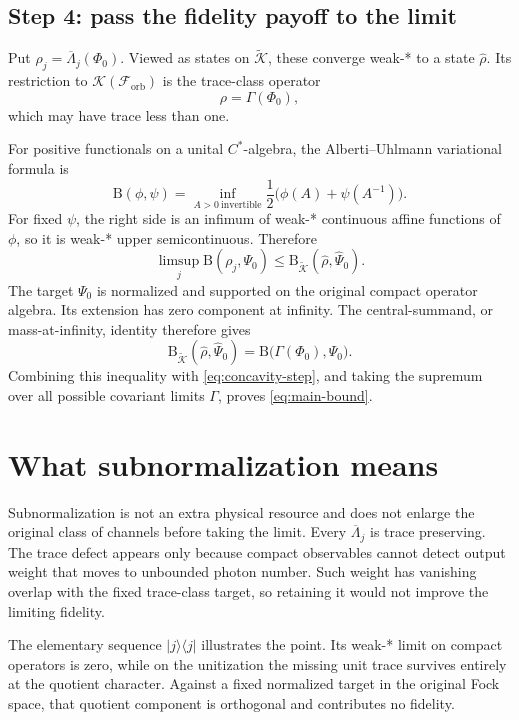 \documentclass[11pt]{article}
\newcommand{\F}{\mathcal F_{\mathrm{orb}}}
\newcommand{\K}{\mathcal K}
\newcommand{\B}{\mathrm B}
\begin{document}
\subsection{Step 4: pass the fidelity payoff to the limit}

Put $\rho_j=\overline\Lambda_j(\Phi_0)$.  Viewed as states on
$\widetilde{\K}$, these converge weak-* to a state
$\widehat\rho$.  Its restriction to $\K(\F)$ is the trace-class operator
\[
  \rho=\Gamma(\Phi_0),
\]
which may have trace less than one.

For positive functionals on a unital $C^*$-algebra, the
Alberti--Uhlmann variational formula is
\begin{equation}\label{eq:AU}
  \B(\phi,\psi)
  =\inf_{A>0\ \mathrm{invertible}}
  \frac12\bigl(\phi(A)+\psi(A^{-1})\bigr).
\end{equation}
For fixed $\psi$, the right side is an infimum of weak-* continuous affine
functions of $\phi$, so it is weak-* upper semicontinuous.  Therefore
\[
  \limsup_j\B(\rho_j,\Psi_0)
  \leq\B_{\widetilde{\K}}(\widehat\rho,\widehat\Psi_0).
\]
The target $\Psi_0$ is normalized and supported on the original compact
operator algebra.  Its extension has zero component at infinity.  The
central-summand, or mass-at-infinity, identity therefore gives
\[
  \B_{\widetilde{\K}}(\widehat\rho,\widehat\Psi_0)
  =\B\bigl(\Gamma(\Phi_0),\Psi_0\bigr).
\]
Combining this inequality with \eqref{eq:concavity-step}, and taking the
supremum over all possible covariant limits $\Gamma$, proves
\eqref{eq:main-bound}.

\section{What subnormalization means}

Subnormalization is not an extra physical resource and does not enlarge the
original class of channels before taking the limit.  Every
$\overline\Lambda_j$ is trace preserving.  The trace defect appears only
because compact observables cannot detect output weight that moves to
unbounded photon number.  Such weight has vanishing overlap with the fixed
trace-class target, so retaining it would not improve the limiting fidelity.

The elementary sequence $|j\rangle\langle j|$ illustrates the point.  Its
weak-* limit on compact operators is zero, while on the unitization the
missing unit trace survives entirely at the quotient character.  Against a
fixed normalized target in the original Fock space, that quotient component
is orthogonal and contributes no fidelity.
\end{document}

